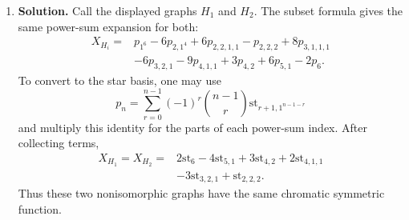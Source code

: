 \documentclass{article}
\begin{document}
\begin{enumerate}
For $T_5$, apply DNC to the unique internal edge adjacent to the
degree-$3$ vertex.  The deletion, dot-contraction, and
leaf-contraction terms are respectively star forests of types
$(3,2)$, $(4,1)$, and $(5)$.  Thus
\[
\boxed{X_{T_5}=\mathrm{st}_5-\mathrm{st}_{4,1}
                       +\mathrm{st}_{3,2}.}
\]
Similarly, applying DNC to the middle edge of $P_4$ gives
\[
X_{P_4}=\mathrm{st}_{2,2}-\mathrm{st}_{3,1}+\mathrm{st}_4.
\]
Applying DNC to an internal edge of $P_5$ then gives
\[
\begin{aligned}
X_{P_5}
&=\mathrm{st}_{3,2}-X_{P_4}\mathrm{st}_1+X_{T_5}\\
&=\boxed{\mathrm{st}_5-2\mathrm{st}_{4,1}
+2\mathrm{st}_{3,2}+\mathrm{st}_{3,1,1}
-\mathrm{st}_{2,2,1}.}
\end{aligned}
\]
Finally, by definition,
\[
\boxed{X_{St_5}=\mathrm{st}_5.}
\]

\item \textbf{Solution.}
Call the displayed graphs $H_1$ and $H_2$.  The subset formula gives
the same power-sum expansion for both:
\[
\begin{aligned}
X_{H_i}={}&p_{1^6}-6p_{2,1^4}+6p_{2,2,1,1}-p_{2,2,2}
+8p_{3,1,1,1}\\
&-6p_{3,2,1}-9p_{4,1,1}+3p_{4,2}
+6p_{5,1}-2p_6.
\end{aligned}
\]
To convert to the star basis, one may use
\[
p_n=\sum_{r=0}^{n-1}(-1)^r\binom{n-1}{r}
\mathrm{st}_{r+1,1^{n-1-r}}
\]
and multiply this identity for the parts of each power-sum index.
After collecting terms,
\[
\boxed{\begin{aligned}
X_{H_1}=X_{H_2}
={}&2\mathrm{st}_6-4\mathrm{st}_{5,1}
+3\mathrm{st}_{4,2}+2\mathrm{st}_{4,1,1}\\
&-3\mathrm{st}_{3,2,1}+\mathrm{st}_{2,2,2}.
\end{aligned}}
\]
Thus these two nonisomorphic graphs have the same chromatic symmetric
function.

\end{enumerate}
\end{document}
